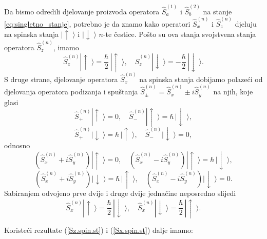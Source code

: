 Da bismo odredili djelovanje proizvoda operatora $\hat{S}_a^{(1)}$
i $\hat{S}_b^{(2)}$ na stanje \eqref{eq:singletno_stanje}, potrebno je da znamo kako
operatori $\hat{S}_x^{(n)}$ i $\hat{S}_z^{(n)}$ djeluju na spinska
stanja $|\!\uparrow\;\!\rangle$ i $|\!\downarrow\;\!\rangle$
$n$-te \v cestice. Po\v sto su ova stanja svojstvena stanja
operatora $\hat{S}_z^{(n)}$, imamo
\begin{equation}
\hat{S}_z^{(n)} |\!\uparrow\;\!\rangle = \frac{\hbar}{2}\,
|\!\uparrow\;\!\rangle, \quad \hat{S}_z^{(n)}
|\!\downarrow\;\!\rangle = -\frac{\hbar}{2}\,
|\!\downarrow\;\!\rangle. \label{Sz.spin.st}
\end{equation}
S druge strane, djelovanje operatora $\hat{S}_x^{(n)}$ na spinska
stanja dobijamo polaze\'ci od djelovanja operatora podizanja i
spu\v stanja $\hat{S}_\pm^{(n)} = \hat{S}_x^{(n)} \pm i
\hat{S}_y^{(n)}$ na njih, koje glasi
\begin{equation}
\hat{S}_+^{(n)} |\!\uparrow\;\!\rangle = 0, \quad \hat{S}_-^{(n)}
|\!\uparrow\;\!\rangle = \hbar\, |\!\downarrow\;\!\rangle,
\end{equation}
\begin{equation}
\hat{S}_+^{(n)} |\!\downarrow\;\!\rangle = \hbar\,
|\!\uparrow\;\!\rangle, \quad \hat{S}_-^{(n)}
|\!\downarrow\;\!\rangle = 0,
\end{equation}
odnosno
\begin{equation}
(\hat{S}_x^{(n)} + i \hat{S}_y^{(n)}) |\!\uparrow\;\!\rangle = 0,
\quad (\hat{S}_x^{(n)} - i \hat{S}_y^{(n)}) |\!\uparrow\;\!\rangle
= \hbar\, |\!\downarrow\;\!\rangle,
\end{equation}
\begin{equation}
(\hat{S}_x^{(n)} + i \hat{S}_y^{(n)}) |\!\downarrow\;\!\rangle =
\hbar\, |\!\uparrow\;\!\rangle, \quad (\hat{S}_x^{(n)} - i
\hat{S}_y^{(n)}) |\!\downarrow\;\!\rangle = 0.
\end{equation}
Sabiranjem odvojeno prve dvije i druge dvije jedna\v cine
neposredno slijedi
\begin{equation}
\hat{S}_x^{(n)} |\!\uparrow\;\!\rangle = \frac{\hbar}{2}\,
|\!\downarrow\;\!\rangle, \quad \hat{S}_x^{(n)}
|\!\downarrow\;\!\rangle = \frac{\hbar}{2}\,
|\!\uparrow\;\!\rangle. \label{Sx.spin.st}
\end{equation}

Koriste\'ci rezultate (\ref{Sz.spin.st}) i (\ref{Sx.spin.st})
dalje imamo: